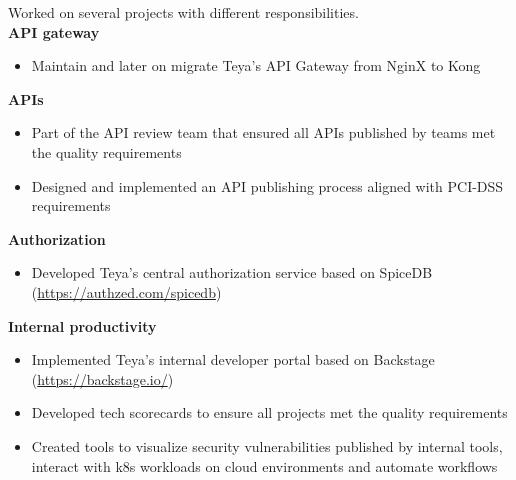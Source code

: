 \documentclass[a4paper,10pt]{memoir} %
\begin{document}
\userinformation %

\framebreak %







{Worked on several projects with different responsibilities. \\
\textbf{API gateway}
\begin{itemize}
  \item Maintain and later on migrate Teya's API Gateway from NginX to Kong
\end{itemize}
\textbf{APIs}
\begin{itemize}
  \item Part of the API review team that ensured all APIs published by teams met the quality requirements
  \item Designed and implemented an API publishing process aligned with PCI-DSS requirements
\end{itemize}
\textbf{Authorization}
\begin{itemize}
  \item Developed Teya's central authorization service based on SpiceDB (\url{https://authzed.com/spicedb})
\end{itemize}
\textbf{Internal productivity}
\begin{itemize}
  \item Implemented Teya's internal developer portal based on Backstage (\url{https://backstage.io/})
  \item Developed tech scorecards to ensure all projects met the quality requirements
  \item Created tools to visualize security vulnerabilities published by internal tools,
  interact with k8s workloads on cloud environments and automate workflows
\end{itemize}
}
\end{document}

